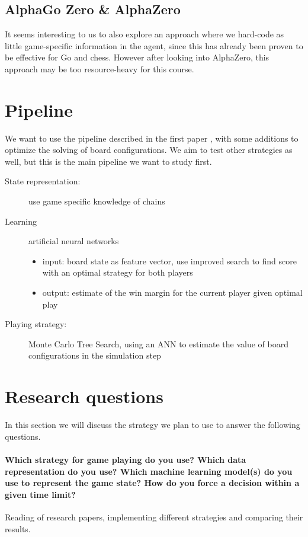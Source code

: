 \documentclass[11pt,a4paper]{article}
\begin{document}
	\subsection{AlphaGo Zero \& AlphaZero}
	It seems interesting to us to also explore an approach where we hard-code as little game-specific information in the agent, since this has already been proven to be effective for Go and chess. However after looking into AlphaZero, this approach may be too resource-heavy for this course.
	
	\section{Pipeline}
	We want to use the pipeline described in the first paper \cite{7317912}, with some additions to optimize the solving of board configurations. We aim to test other strategies as well, but this is the main pipeline we want to study first.

	\begin{description}
		\item[State representation:] use game specific knowledge of chains
		\item[Learning] artificial neural networks
		\begin{itemize}
			\item input: board state as feature vector, use improved search to find score with an optimal strategy for both players
			\item output: estimate of the win margin for the current player given optimal play
		\end{itemize}
		\item[Playing strategy:] Monte Carlo Tree Search, using an ANN to estimate the value of board configurations in the simulation step
	\end{description}

	\section{Research questions}
	In this section we will discuss the strategy we plan to use to answer the following questions.
	\paragraph{Which strategy for game playing do you use? Which data representation do you use? Which machine learning model(s) do you use to represent the game state? How do you force a decision within a given time limit?} Reading of research papers, implementing different strategies and comparing their results.
\end{document}
